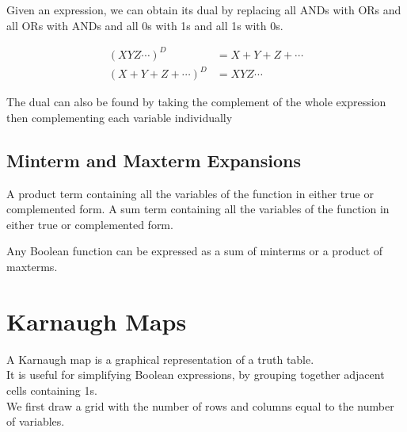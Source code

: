 \documentclass{report}
\begin{document}
Given an expression, we can obtain its dual by replacing all ANDs with ORs and all ORs with ANDs and all 0s with 1s and all 1s with 0s.

\begin{align*}
	(XYZ\cdots)^D         & = X + Y + Z + \cdots \\
	(X + Y + Z +\cdots)^D & = XYZ\cdots
\end{align*}

The dual can also be found by taking the complement of the whole expression then complementing each variable individually

\section{Minterm and Maxterm Expansions}

\begin{description}
	\ii[Minterm] A product term containing all the variables of the function in either true or complemented form.
	\ii[Maxterm] A sum term containing all the variables of the function in either true or complemented form.
\end{description}

Any Boolean function can be expressed as a sum of minterms or a product of maxterms.



\chapter{Karnaugh Maps}

A Karnaugh map is a graphical representation of a truth table.\\

It is useful for simplifying Boolean expressions, by grouping together adjacent cells containing 1s.\\

We first draw a grid with the number of rows and columns equal to the number of variables.\\
\end{document}

